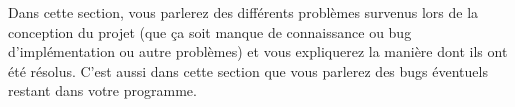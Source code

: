 Dans cette section, vous parlerez des différents problèmes survenus lors de la conception du projet (que ça soit manque de connaissance ou bug d'implémentation ou autre problèmes) et vous expliquerez la manière dont ils ont été résolus.
C'est aussi dans cette section que vous parlerez des bugs éventuels restant dans votre programme.